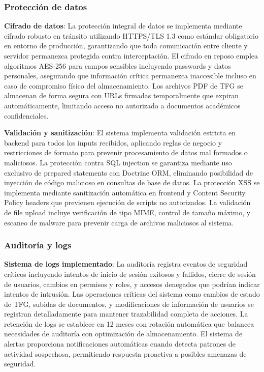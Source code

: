 \documentclass[12pt,a4paper,oneside]{report}
\begin{document}
\subsubsection{Protección de datos}\label{protecciuxf3n-de-datos}

\textbf{Cifrado de datos}: La protección integral de datos se implementa mediante cifrado robusto en tránsito utilizando HTTPS/TLS 1.3 como estándar obligatorio en entorno de producción, garantizando que toda comunicación entre cliente y servidor permanezca protegida contra interceptación. El cifrado en reposo emplea algoritmos AES-256 para campos sensibles incluyendo passwords y datos personales, asegurando que información crítica permanezca inaccesible incluso en caso de compromiso físico del almacenamiento. Los archivos PDF de TFG se almacenan de forma segura con URLs firmadas temporalmente que expiran automáticamente, limitando acceso no autorizado a documentos académicos confidenciales.

\textbf{Validación y sanitización}: El sistema implementa validación estricta en backend para todos los inputs recibidos, aplicando reglas de negocio y restricciones de formato para prevenir procesamiento de datos mal formados o maliciosos. La protección contra SQL injection se garantiza mediante uso exclusivo de prepared statements con Doctrine ORM, eliminando posibilidad de inyección de código malicioso en consultas de base de datos. La protección XSS se implementa mediante sanitización automática en frontend y Content Security Policy headers que previenen ejecución de scripts no autorizados. La validación de file upload incluye verificación de tipo MIME, control de tamaño máximo, y escaneo de malware para prevenir carga de archivos maliciosos al sistema.

\subsubsection{Auditoría y logs}\label{auditoruxeda-y-logs}

\textbf{Sistema de logs implementado}: La auditoría registra eventos de seguridad críticos incluyendo intentos de inicio de sesión exitosos y fallidos, cierre de sesión de usuarios, cambios en permisos y roles, y accesos denegados que podrían indicar intentos de intrusión. Las operaciones críticas del sistema como cambios de estado de TFG, subidas de documentos, y modificaciones de información de usuarios se registran detalladamente para mantener trazabilidad completa de acciones. La retención de logs se establece en 12 meses con rotación automática que balancea necesidades de auditoría con optimización de almacenamiento. El sistema de alertas proporciona notificaciones automáticas cuando detecta patrones de actividad sospechosa, permitiendo respuesta proactiva a posibles amenazas de seguridad.
\end{document}
